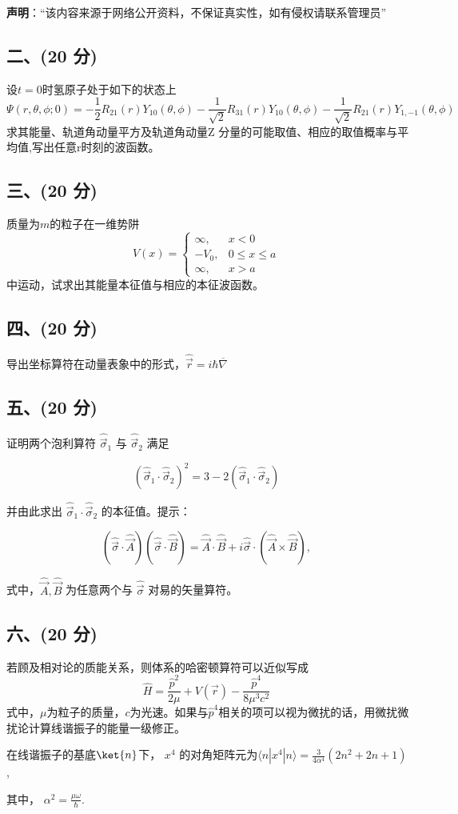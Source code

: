 
\textbf{声明}：“该内容来源于网络公开资料，不保证真实性，如有侵权请联系管理员”

\subsection{二、(20 分)}
设$t=0$时氢原子处于如下的状态上
$$\Psi(r, \theta, \phi; 0) = -\frac{1}{2} R_{21}(r) Y_{10} (\theta, \phi) - \frac{1}{\sqrt{2}} R_{31}(r) Y_{10} (\theta, \phi) - \frac{1}{\sqrt{2}} R_{21}(r) Y_{1,-1} (\theta, \phi)~$$
求其能量、轨道角动量平方及轨道角动量Z 分量的可能取值、相应的取值概率与平均值,写出任意r时刻的波函数。
\subsection{三、(20 分)}
质量为$m$的粒子在一维势阱
\[
V(x) = \begin{cases} 
\infty, & x < 0 \\
-V_0, & 0 \leq x \leq a \\
\infty, & x > a
\end{cases}~
\] 
中运动，试求出其能量本征值与相应的本征波函数。
\subsection{四、(20 分)}
导出坐标算符在动量表象中的形式，$\hat{\vec{r}} = i\hbar\overline{\nabla}$
\subsection{五、(20 分)}
证明两个泡利算符 $\hat{\vec{\sigma}}_1$ 与 $\hat{\vec{\sigma}}_2$ 满足

$$(\hat{\vec{\sigma}}_1 \cdot \hat{\vec{\sigma}}_2)^2 = 3 - 2 (\hat{\vec{\sigma}}_1 \cdot \hat{\vec{\sigma}}_2)~$$

并由此求出 $\hat{\vec{\sigma}}_1 \cdot \hat{\vec{\sigma}}_2$ 的本征值。提示：

$$ \left( \hat{\vec{\sigma}} \cdot \hat{\vec{A}} \right) \left( \hat{\vec{\sigma}} \cdot \hat{\vec{B}} \right) = \hat{\vec{A}} \cdot \hat{\vec{B}} + i \hat{\vec{\sigma}} \cdot (
\hat{\vec{A}} \times \hat{\vec{B}}), ~$$

式中，$\hat{\vec{A}}, \hat{\vec{B}}$ 为任意两个与 $\hat{\vec{\sigma}}$ 对易的矢量算符。
\subsection{六、(20 分)}
若顾及相对论的质能关系，则体系的哈密顿算符可以近似写成
$$\hat{H}=\frac{\hat{p}^2}{2\mu}+V(\vec{r})-\frac{\hat{p}^4}{8\mu^3c^2}~$$
式中，$\mu$为粒子的质量，$c$为光速。如果与$\hat{p}^4$相关的项可以视为微扰的话，用微扰微扰论计算线谐振子的能量一级修正。

在线谐振子的基底$\ket{n}$下， $x^4$ 的对角矩阵元为$\langle n|x^4|n\rangle = \frac{3}{4\alpha^4} \left(2n^2 + 2n + 1 \right)$, 

其中， $\alpha^2 = \frac{\mu\omega}{\hbar}$.


